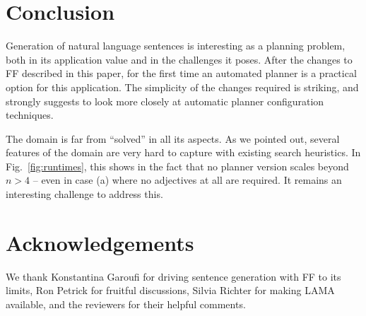 
\section{Conclusion} \label{sec:conclusion}


Generation of natural language sentences is interesting as a planning
problem, both in its application value and in the challenges it
poses. After the changes to FF described in this paper, for the first
time an automated planner is a practical option for this
application. The simplicity of the changes required is striking, and
strongly suggests to look more closely at automatic planner
configuration techniques.


The domain is far from ``solved'' in all its aspects. As we pointed
out, several features of the domain are very hard to capture with
existing search heuristics. In Fig.~\ref{fig:runtimes}, this shows in
the fact that no planner version scales beyond $n>4$ -- even in case
(a) where no adjectives at all are required. It remains an interesting
challenge to address this.


\section*{Acknowledgements}
We thank Konstantina Garoufi for driving sentence generation with FF
to its limits, Ron Petrick for fruitful discussions, Silvia Richter
for making LAMA available, and the reviewers for their helpful
comments.




